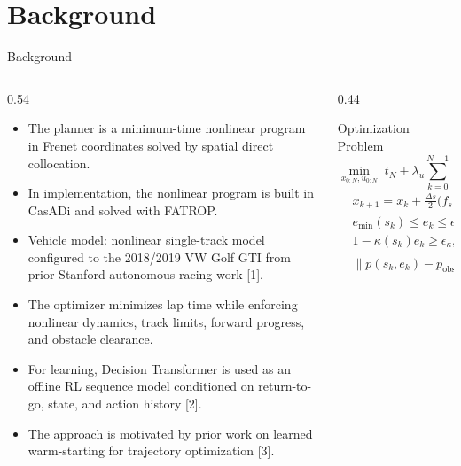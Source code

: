 \documentclass[aspectratio=169]{beamer}
\begin{document}
\section{Background}
\begin{frame}{Background}\small
\begin{columns}[T]
\begin{column}{0.54\linewidth}
\begin{itemize}
  \item The planner is a minimum-time nonlinear program in Frenet coordinates solved by spatial direct collocation.
  \item In implementation, the nonlinear program is built in CasADi and solved with FATROP.
  \item Vehicle model: nonlinear single-track model configured to the 2018/2019 VW Golf GTI from prior Stanford autonomous-racing work [1].
  \item The optimizer minimizes lap time while enforcing nonlinear dynamics, track limits, forward progress, and obstacle clearance.
  \item For learning, Decision Transformer is used as an offline RL sequence model conditioned on return-to-go, state, and action history [2].
  \item The approach is motivated by prior work on learned warm-starting for trajectory optimization [3].
\end{itemize}
\end{column}
\begin{column}{0.44\linewidth}
\begin{block}{Optimization Problem}
\tiny
\[
\min_{x_{0:N},u_{0:N}} \; t_N + \lambda_u\sum_{k=0}^{N-1}\lVert u_{k+1}-u_k\rVert^2
\]
\vspace{-1.1em}
\begin{align*}
&x_{k+1} = x_k + \frac{\Delta s}{2}\Big(f_s(x_k,u_k)+f_s(x_{k+1},u_{k+1})\Big) \\
&e_{\min}(s_k) \le e_k \le e_{\max}(s_k), \quad \dot{s}_k \ge \epsilon_s \\
&1-\kappa(s_k)e_k \ge \epsilon_\kappa, \quad F_{x,\min} \le F_{x,k} \le F_{x,\max} \\
&\lVert p(s_k,e_k)-p_{\mathrm{obs},i}\rVert^2 \ge R_{\mathrm{safe},i}^2
\end{align*}
\end{block}
\end{column}
\end{columns}
\end{frame}
\end{document}
